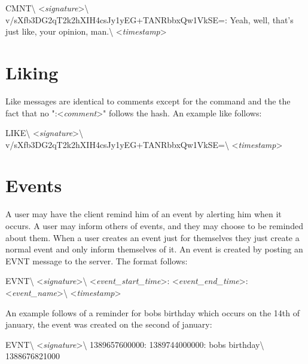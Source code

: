 \begin{center}
CMNT\textbackslash
\textless \textit{signature}\textgreater\textbackslash
v/sXfb3DG2qT2k2hXIH4csJy1yEG+TANRbbxQw1VkSE=:
Yeah, well, that's just like, your opinion, man.\textbackslash
\textless \textit{timestamp}\textgreater
\end{center}

\section{Liking}
Like messages are identical to comments except for the command and the the fact
that no ":\textless \textit{comment}\textgreater" follows the hash. An example
like follows:

\begin{center}
LIKE\textbackslash
\textless \textit{signature}\textgreater\textbackslash
v/sXfb3DG2qT2k2hXIH4csJy1yEG+TANRbbxQw1VkSE=\textbackslash
\textless \textit{timestamp}\textgreater
\end{center}

\section{Events}
A user may have the client remind him of an event by alerting him when it
occurs. A user may inform others of events, and they may choose to be reminded
about them. When a user creates an event just for themselves they just create a
normal event and only inform themselves of it. An event is created by posting an
EVNT message to the server. The format follows:

\begin{center}
EVNT\textbackslash
\textless \textit{signature}\textgreater\textbackslash
\textless \textit{event\_start\_time}\textgreater:
\textless \textit{event\_end\_time}\textgreater:
\textless \textit{event\_name}\textgreater\textbackslash
\textless \textit{timestamp}\textgreater
\end{center}

An example follows of a reminder for bobs birthday which occurs on the 14th of
january, the event was created on the second of january:

\begin{center}
EVNT\textbackslash
\textless \textit{signature}\textgreater\textbackslash
1389657600000:
1389744000000:
bobs birthday\textbackslash
1388676821000
\end{center}
